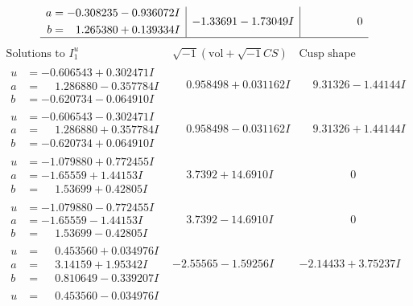 \documentclass[1p]{elsarticle_modified}
\theoremstyle{definition}
\newcommand{\I}{\sqrt{-1}}
\begin{document}
$$\begin{array}{c|c|c}
\begin{aligned}
a &= -0.308235 - 0.936072 I \\
b &= \phantom{-}1.265380 + 0.139334 I\end{aligned}
 & -1.33691 - 1.73049 I & \phantom{-0.000000 } 0\\
 \hline 
 \end{array}$$\newpage$$\begin{array}{c|c|c}  
\text{Solutions to }I^u_{1}& \I (\text{vol} + \sqrt{-1}CS) & \text{Cusp shape}\\
 \hline 
\begin{aligned}
u &= -0.606543 + 0.302471 I \\
a &= \phantom{-}1.286880 - 0.357784 I \\
b &= -0.620734 - 0.064910 I\end{aligned}
 & \phantom{-}0.958498 + 0.031162 I & \phantom{-}9.31326 - 1.44144 I \\ \hline\begin{aligned}
u &= -0.606543 - 0.302471 I \\
a &= \phantom{-}1.286880 + 0.357784 I \\
b &= -0.620734 + 0.064910 I\end{aligned}
 & \phantom{-}0.958498 - 0.031162 I & \phantom{-}9.31326 + 1.44144 I \\ \hline\begin{aligned}
u &= -1.079880 + 0.772455 I \\
a &= -1.65559 + 1.44153 I \\
b &= \phantom{-}1.53699 + 0.42805 I\end{aligned}
 & \phantom{-}3.7392 + 14.6910 I & \phantom{-0.000000 } 0 \\ \hline\begin{aligned}
u &= -1.079880 - 0.772455 I \\
a &= -1.65559 - 1.44153 I \\
b &= \phantom{-}1.53699 - 0.42805 I\end{aligned}
 & \phantom{-}3.7392 - 14.6910 I & \phantom{-0.000000 } 0 \\ \hline\begin{aligned}
u &= \phantom{-}0.453560 + 0.034976 I \\
a &= \phantom{-}3.14159 + 1.95342 I \\
b &= \phantom{-}0.810649 - 0.339207 I\end{aligned}
 & -2.55565 - 1.59256 I & -2.14433 + 3.75237 I \\ \hline\begin{aligned}
u &= \phantom{-}0.453560 - 0.034976 I \\

\end{aligned}
\end{array}$$
\end{document}
